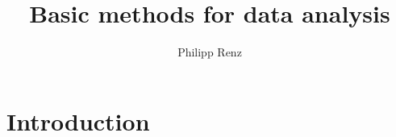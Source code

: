 \documentclass{book}
\title{Basic methods for data analysis}
\author{Philipp Renz}
\begin{document}
\frontmatter
\maketitle
\tableofcontents

\mainmatter
\chapter{Introduction}



\end{document}
